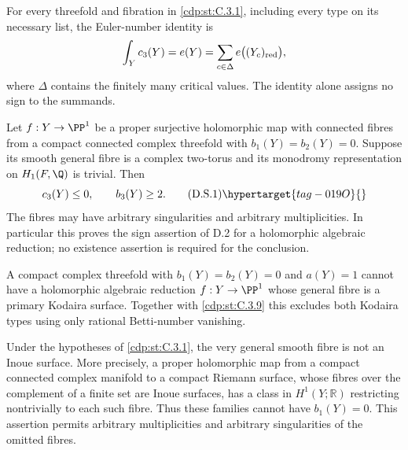 \begin{proposition}\hypertarget{tag-01FB}{}\label{cdp:st:C.3.5}


For every threefold and fibration in \ref{cdp:st:C.3.1}, including every type on
its necessary list, the Euler-number identity is
\[
\int_Y c_3(Y)=e(Y)=\sum_{c\in\Delta}e\bigl((Y_c)_{\rm red}\bigr),
\]
where $\Delta$ contains the finitely many critical values.
The identity alone assigns no sign to the summands.
\end{proposition}

\begin{proposition}\hypertarget{tag-01GC}{}\label{cdp:st:D.2.5}



Let $f:Y\to\PP^1$ be a proper surjective holomorphic map with
connected fibres from a compact connected complex threefold with
$b_1(Y)=b_2(Y)=0$. Suppose its smooth general fibre is a complex
two-torus and its monodromy representation on $H_1(F,\Q)$ is
trivial. Then
\[
 c_3(Y)\le0,\qquad b_3(Y)\ge2.
 \tag{D.S.1}\hypertarget{tag-019O}{}\label{cdp:eq:D.S.1}
\]
The fibres may have arbitrary singularities and arbitrary
multiplicities. In particular this proves the sign assertion of
D.2 for a holomorphic algebraic reduction; no existence assertion
is required for the conclusion.
\end{proposition}

\begin{proposition}\hypertarget{tag-01F5}{}\label{cdp:st:C.3.10}



A compact complex threefold with $b_1(Y)=b_2(Y)=0$ and
$a(Y)=1$ cannot have a holomorphic algebraic reduction
$f:Y\to\PP^1$ whose general fibre is a primary Kodaira
surface. Together with \ref{cdp:st:C.3.9} this excludes both Kodaira
types using only rational Betti-number vanishing.
\end{proposition}

\begin{proposition}\hypertarget{tag-01F7}{}\label{cdp:st:C.3.12}



Under the hypotheses of \ref{cdp:st:C.3.1}, the very general smooth fibre is
not an Inoue surface. More precisely, a proper holomorphic map from
a compact connected complex manifold to a compact Riemann surface,
whose fibres over the complement of a finite set are Inoue surfaces,
has a class in $H^1(Y;\mathbb R)$ restricting nontrivially to each
such fibre. Thus these families cannot have $b_1(Y)=0$.
This assertion permits arbitrary multiplicities and arbitrary
singularities of the omitted fibres.
\end{proposition}


